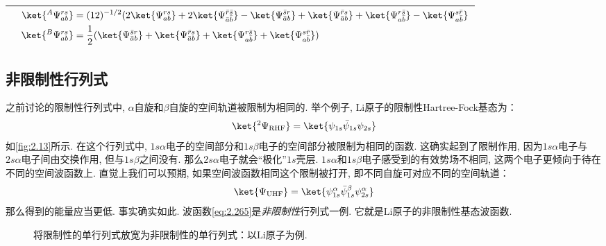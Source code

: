 \begin{table}[h]
\begin{tabular}{ll}
\begin{tikzpicture}[baseline={(current bounding box.center)}]
		\end{tikzpicture}
		& 
		$\begin{aligned}
                    {\ket{^A\Psi_{ab}^{rs}}} &= (12)^{-1/2}(2\ket{\Psi_{ab}^{rs}} + 2\ket{\Psi_{\bar{a}\bar{b}}^{\bar{r}\bar{s}}} - \ket{\Psi_{\bar{a}b}^{\bar{s}r}} + \ket{\Psi_{\bar{a}b}^{\bar{r}s}} + \ket{\Psi_{a\bar{b}}^{r\bar{s}}} - \ket{\Psi_{a\bar{b}}^{s\bar{r}}}\\
		{\ket{^B\Psi_{ab}^{rs}}} & = \frac{1}{2}(\ket{\Psi_{\bar{a}b}^{\bar{s}r}} + \ket{\Psi_{\bar{a}b}^{\bar{r}s}} + \ket{\Psi_{a\bar{b}}^{r\bar{s}}} + \ket{\Psi_{a\bar{b}}^{s\bar{r}}})
		\end{aligned}$
                \\\hline
	\end{tabular}
\end{table}
\subsection{非限制性行列式}
\label{sec2.5.3}
之前讨论的限制性行列式中, 
$\alpha$自旋和$\beta$自旋的空间轨道被限制为相同的. 
举个例子, 
$\mathrm{Li}$原子的限制性Hartree-Fock基态为：
\begin{align}\label{eq:2.264}
\ket{^2\Psi_\mathrm{RHF}} = \ket{\psi_{1s}\bar{\psi}_{1s}\psi_{2s}}
\end{align} 
如\autoref{fig:2.13}所示. 
在这个行列式中, 
$1s\alpha$电子的空间部分和$1s\beta$电子的空间部分被限制为相同的函数. 
这确实起到了限制作用, 
因为$1s\alpha$电子与$2s\alpha$电子间由交换作用, 
但与$1s\beta$之间没有. 
那么$2s\alpha$电子就会``极化”$1s$壳层. 
$1s\alpha$和$1s\beta$电子感受到的有效势场不相同, 
这两个电子更倾向于待在不同的空间波函数上. 
直觉上我们可以预期, 
如果空间波函数相同这个限制被打开, 
即不同自旋可对应不同的空间轨道：
\begin{align}\label{eq:2.265}
\ket{\Psi_\mathrm{UHF}} = \ket{\psi_{1s}^\alpha\bar{\psi}_{1s}^\beta\psi_{2s}^\alpha}
\end{align}
那么得到的能量应当更低. 
事实确实如此. 
波函数\autoref{eq:2.265}是\emph{非限制性}行列式一例. 
它就是$\mathrm{Li}$原子的非限制性基态波函数.
\begin{figure}[H]
        \centering
        \caption{将限制性的单行列式放宽为非限制性的单行列式：以$\mathrm{Li}$原子为例.}
        \label{fig:2.13}
\end{figure}


